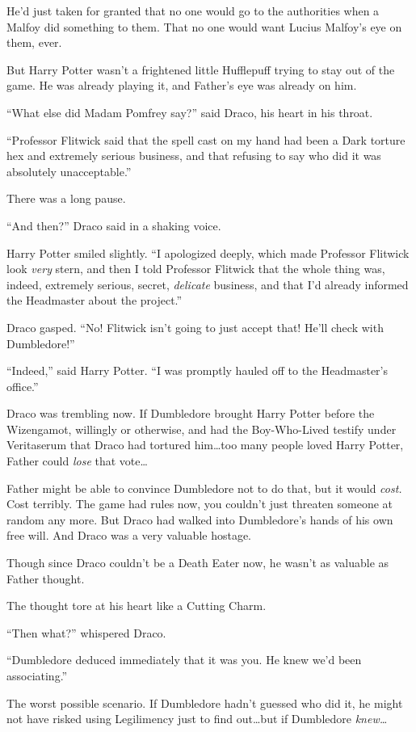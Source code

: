 He’d just taken for granted that no one would go to the authorities when a Malfoy did something to them. That no one would want Lucius Malfoy’s eye on them, ever.

But Harry Potter wasn’t a frightened little Hufflepuff trying to stay out of the game. He was already playing it, and Father’s eye was already on him.

“What else did Madam Pomfrey say?” said Draco, his heart in his throat.

“Professor Flitwick said that the spell cast on my hand had been a Dark torture hex and extremely serious business, and that refusing to say who did it was absolutely unacceptable.”

There was a long pause.

“And then?” Draco said in a shaking voice.

Harry Potter smiled slightly. “I apologized deeply, which made Professor Flitwick look \emph{very} stern, and then I told Professor Flitwick that the whole thing was, indeed, extremely serious, secret, \emph{delicate} business, and that I’d already informed the Headmaster about the project.”

Draco gasped. “No! Flitwick isn’t going to just accept that! He’ll check with Dumbledore!”

“Indeed,” said Harry Potter. “I was promptly hauled off to the Headmaster’s office.”

Draco was trembling now. If Dumbledore brought Harry Potter before the Wizengamot, willingly or otherwise, and had the Boy-Who-Lived testify under Veritaserum that Draco had tortured him…too many people loved Harry Potter, Father could \emph{lose} that vote…

Father might be able to convince Dumbledore not to do that, but it would \emph{cost.} Cost terribly. The game had rules now, you couldn’t just threaten someone at random any more. But Draco had walked into Dumbledore’s hands of his own free will. And Draco was a very valuable hostage.

Though since Draco couldn’t be a Death Eater now, he wasn’t as valuable as Father thought.

The thought tore at his heart like a Cutting Charm.

“Then what?” whispered Draco.

“Dumbledore deduced immediately that it was you. He knew we’d been associating.”

The worst possible scenario. If Dumbledore hadn’t guessed who did it, he might not have risked using Legilimency just to find out…but if Dumbledore \emph{knew…}

